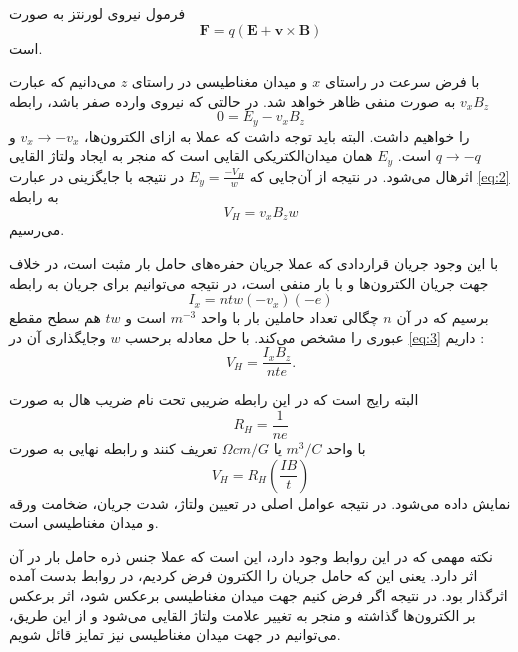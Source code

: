 \documentclass[conference]{IEEEtran-ModifiedForMVIP}
\begin{document}
فرمول نیروی لورنتز به صورت 
\begin{equation}
	\boldsymbol{F} = q(\boldsymbol{E} + \boldsymbol{v} \times \boldsymbol{B})
\end{equation}
است.
\cite{halliday2010fundamentals}

با فرض سرعت در راستای $x$ و میدان مغناطیسی در راستای $z$ می‌دانیم که عبارت $v_x B_z$ به صورت منفی ظاهر خواهد شد. در حالتی که نیروی وارده صفر باشد، رابطه
\begin{equation}
0 = E_y - v_x B_z
\label{eq:2}
\end{equation}
را خواهیم داشت. البته باید توجه داشت که عملا به ازای الکترون‌ها،
$v_x\rightarrow -v_x$
و
$q \rightarrow -q$
است. $E_y$ همان میدان‌‌الکتریکی القایی است که منجر به ایجاد ولتاژ القایی اثرهال می‌شود.  در نتیجه از آن‌جایی که
$E_y = \frac{-V_H}{w}$
در نتیجه با جایگزینی در عبارت \eqref{eq:2} به رابطه
\begin{equation}
	V_H = v_x B_z w
	\label{eq:3}
\end{equation}
می‌رسیم.

با این وجود جریان قراردادی که عملا جریان حفره‌های حامل بار مثبت است، در خلاف جهت جریان الکترون‌ها و با بار منفی است، در نتیجه می‌توانیم برای جریان به رابطه
\begin{equation}
	I_x = ntw(-v_x)(-e)
\end{equation}
برسیم که در آن $n$ چگالی تعداد حاملین بار با واحد $m^{-3}$ است و $tw$ هم سطح مقطع عبوری را مشخص می‌کند. با حل معادله برحسب $w$ وجایگذاری آن در
\eqref{eq:3}
داریم \cite{noauthor_hall_2021}:
\begin{equation}
	V_H = \frac{I_x B_z}{n t e}.
\end{equation}


البته رایج است که در این رابطه ضریبی تحت نام ضریب هال به صورت 
\begin{equation}
	R_H = \frac{1}{n e}
\end{equation}
با واحد $m^3/C$ یا $\Omega cm/G$ تعریف کنند و رابطه نهایی به صورت
\begin{equation}
	V_H = R_H (\frac{I B}{t})
	\label{eq:7}
\end{equation}
نمایش داده می‌شود. در نتیجه عوامل اصلی در تعیین ولتاژ، شدت جریان، ضخامت ورقه و میدان مغناطیسی است.
\cite{ele_hall_2013}

نکته مهمی که در این روابط وجود دارد، این است که عملا جنس ذره حامل بار در آن اثر دارد. یعنی این که حامل جریان را الکترون فرض کردیم، در روابط بدست آمده اثرگذار بود. در نتیجه اگر فرض کنیم جهت میدان مغناطیسی برعکس شود، اثر برعکس بر الکترون‌ها گذاشته و منجر به تغییر علامت ولتاژ القایی می‌شود و از این طریق، می‌توانیم در جهت میدان مغناطیسی نیز تمایز قائل شویم.
\cite{noauthor_hall_2021}
\end{document}
